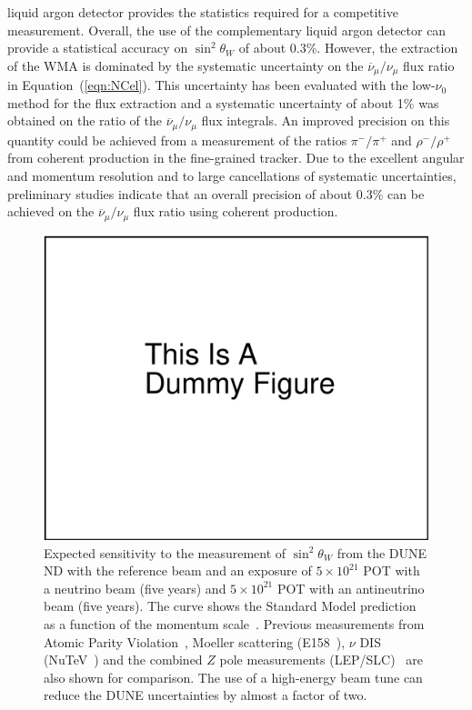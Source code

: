liquid argon %
detector provides the statistics required for a competitive measurement.
Overall, the use of the complementary liquid argon detector can provide a statistical
accuracy on $\sin^2 \theta_W$ of about 0.3\%.  However, the extraction
of the WMA is dominated by the systematic uncertainty on the
$\overline{\nu}_\mu / \nu_\mu$ flux ratio in
Equation~(\ref{eqn:NCel}).  This uncertainty has been evaluated with
the low-$\nu_0$ method for the flux extraction and a systematic
uncertainty of about 1\% was obtained on the ratio of the
$\overline{\nu}_\mu / \nu_\mu$ flux integrals.  An improved precision
on this quantity could be achieved from a measurement of the
ratios $\pi^-/\pi^+$ and $\rho^-/\rho^+$ from coherent production in
the fine-grained tracker.  Due to the excellent angular and momentum
resolution and to large cancellations of systematic uncertainties,
preliminary studies indicate that an overall precision of about 0.3\% can
be achieved on the $\overline{\nu}_\mu / \nu_\mu$ flux ratio using
coherent production.
\begin{figure}[!htb]
\centering\includegraphics[width=.8\textwidth]{graphics/dummy.pdf}
\caption[Expected near detector sensitivity to $\sin^2 \theta_W$ 
for a  beam]{Expected sensitivity to the measurement of $\sin^2 \theta_W$ from the DUNE ND
with the reference  beam and an exposure of $5\times 10^{21}$ POT with a neutrino beam (five years) and 
$5\times 10^{21}$ POT with an antineutrino beam (five years). 
The curve shows the Standard Model prediction as a function of the 
momentum scale~\cite{Czarnecki:2000ic}.
Previous measurements from Atomic Parity Violation~\cite{Bennett:1999zza,Yao:2006px}, Moeller
scattering (E158~\cite{Anthony:2005pm}), $\nu$ DIS (NuTeV~\cite{Zeller:2001hh}) 
and the combined $Z$ pole  measurements (LEP/SLC)~\cite{Yao:2006px}  are also shown for comparison.
The use of a high-energy beam tune
can reduce the DUNE uncertainties by almost a factor of two.
}
\label{fig:sin2thetaw}
\end{figure}
